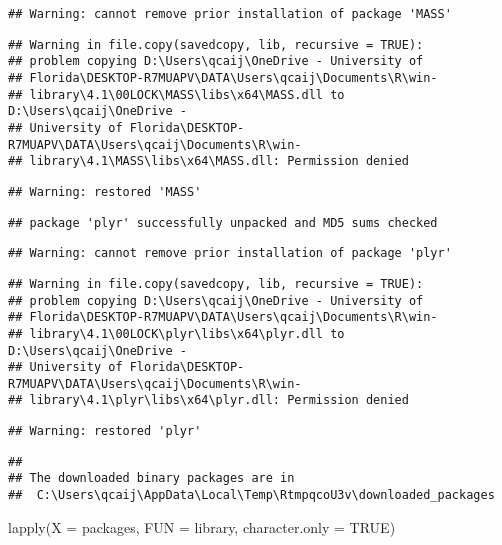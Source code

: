 \documentclass[
]{article}
\newenvironment{Shaded}{\begin{snugshade}}{\end{snugshade}}
\newcommand{\AttributeTok}[1]{\textcolor[rgb]{0.77,0.63,0.00}{#1}}
\newcommand{\ConstantTok}[1]{\textcolor[rgb]{0.00,0.00,0.00}{#1}}
\newcommand{\FunctionTok}[1]{\textcolor[rgb]{0.00,0.00,0.00}{#1}}
\newcommand{\NormalTok}[1]{#1}
\begin{document}
\begin{verbatim}
## Warning: cannot remove prior installation of package 'MASS'
\end{verbatim}

\begin{verbatim}
## Warning in file.copy(savedcopy, lib, recursive = TRUE):
## problem copying D:\Users\qcaij\OneDrive - University of
## Florida\DESKTOP-R7MUAPV\DATA\Users\qcaij\Documents\R\win-
## library\4.1\00LOCK\MASS\libs\x64\MASS.dll to D:\Users\qcaij\OneDrive -
## University of Florida\DESKTOP-R7MUAPV\DATA\Users\qcaij\Documents\R\win-
## library\4.1\MASS\libs\x64\MASS.dll: Permission denied
\end{verbatim}

\begin{verbatim}
## Warning: restored 'MASS'
\end{verbatim}

\begin{verbatim}
## package 'plyr' successfully unpacked and MD5 sums checked
\end{verbatim}

\begin{verbatim}
## Warning: cannot remove prior installation of package 'plyr'
\end{verbatim}

\begin{verbatim}
## Warning in file.copy(savedcopy, lib, recursive = TRUE):
## problem copying D:\Users\qcaij\OneDrive - University of
## Florida\DESKTOP-R7MUAPV\DATA\Users\qcaij\Documents\R\win-
## library\4.1\00LOCK\plyr\libs\x64\plyr.dll to D:\Users\qcaij\OneDrive -
## University of Florida\DESKTOP-R7MUAPV\DATA\Users\qcaij\Documents\R\win-
## library\4.1\plyr\libs\x64\plyr.dll: Permission denied
\end{verbatim}

\begin{verbatim}
## Warning: restored 'plyr'
\end{verbatim}

\begin{verbatim}
## 
## The downloaded binary packages are in
##  C:\Users\qcaij\AppData\Local\Temp\RtmpqcoU3v\downloaded_packages
\end{verbatim}

\begin{Shaded}
\begin{Highlighting}[]
\FunctionTok{lapply}\NormalTok{(}\AttributeTok{X =}\NormalTok{ packages, }\AttributeTok{FUN =}\NormalTok{ library, }\AttributeTok{character.only =} \ConstantTok{TRUE}\NormalTok{)}
\end{Highlighting}
\end{Shaded}
\end{document}
